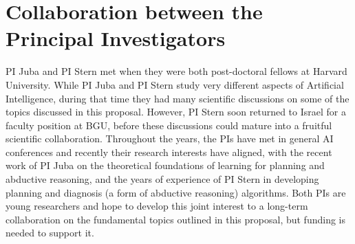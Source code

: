 \documentclass[12pt]{article}
\newcommand{\note}[1]{\textbf{\textit{#1}}}
\begin{document}



\vspace{-0.35cm}
\section{Collaboration between the Principal Investigators}
PI Juba and PI Stern met when they were both post-doctoral fellows at Harvard University. 
While PI Juba and PI Stern study very different aspects of Artificial Intelligence, during that time they had many scientific discussions on some of the topics discussed in this proposal. However, PI Stern soon returned to Israel for a faculty position at BGU, before these discussions could mature into a fruitful scientific collaboration. 
Throughout the years, the PIs have met in general AI conferences
and recently their research interests have aligned, 
with the recent work of PI Juba on the theoretical foundations of learning for planning and abductive reasoning, and the years of experience of PI Stern in developing planning and diagnosis (a form of abductive reasoning) algorithms. 
Both PIs are young researchers and hope to develop this joint interest to a long-term collaboration on the fundamental topics outlined in this proposal, but funding is needed to support it.  
\end{document}
